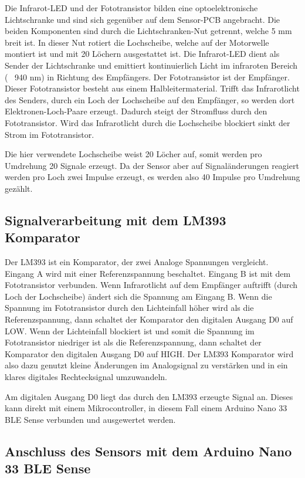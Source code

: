 Die Infrarot-LED und der Fototransistor bilden eine optoelektronische Lichtschranke und sind sich gegenüber auf dem Sensor-PCB angebracht. Die beiden Komponenten sind durch die Lichtschranken-Nut getrennt, welche 5 mm breit ist. In dieser Nut rotiert die Lochscheibe, welche auf der Motorwelle montiert ist und mit 20 Löchern ausgestattet ist. Die Infrarot-LED dient als Sender der Lichtschranke und emittiert kontinuierlich Licht im infraroten Bereich (~ 940 nm) in Richtung des Empfängers. Der Fototransistor ist der Empfänger. Dieser Fototransistor besteht aus einem Halbleitermaterial. Trifft das Infrarotlicht des Senders, durch ein Loch der Lochscheibe auf den Empfänger, so werden dort Elektronen-Loch-Paare erzeugt. Dadurch steigt der Stromfluss durch den Fototransistor. Wird das Infrarotlicht durch die Lochscheibe blockiert sinkt der Strom im Fototransistor. 

Die hier verwendete Lochscheibe weist 20 Löcher auf, somit werden pro Umdrehung 20 Signale erzeugt. Da der Sensor aber auf Signaländerungen reagiert werden pro Loch zwei Impulse erzeugt, es werden also 40 Impulse pro Umdrehung gezählt. 

\subsection{Signalverarbeitung mit dem LM393 Komparator}

Der LM393 ist ein Komparator, der zwei Analoge Spannungen vergleicht. Eingang A wird mit einer Referenzspannung beschaltet. Eingang B ist mit dem Fototransistor verbunden. Wenn Infrarotlicht auf dem Empfänger auftrifft (durch Loch der Lochscheibe) ändert sich die Spannung am Eingang B. Wenn die Spannung im Fototransistor durch den Lichteinfall höher wird als die Referenzspannung, dann schaltet der Komparator den digitalen Ausgang D0 auf LOW. Wenn der Lichteinfall blockiert ist und somit die Spannung im Fototransistor niedriger ist als die Referenzspannung, dann schaltet der Komparator den digitalen Ausgang D0 auf HIGH. Der LM393 Komparator wird also dazu genutzt kleine Änderungen im Analogsignal zu verstärken und in ein klares digitales Rechtecksignal umzuwandeln.

Am digitalen Ausgang D0 liegt das durch den LM393 erzeugte Signal an. Dieses kann direkt mit einem Mikrocontroller, in diesem Fall einem Arduino Nano 33 BLE Sense verbunden und ausgewertet werden.

\subsection{Anschluss des Sensors mit dem Arduino Nano 33 BLE Sense}

